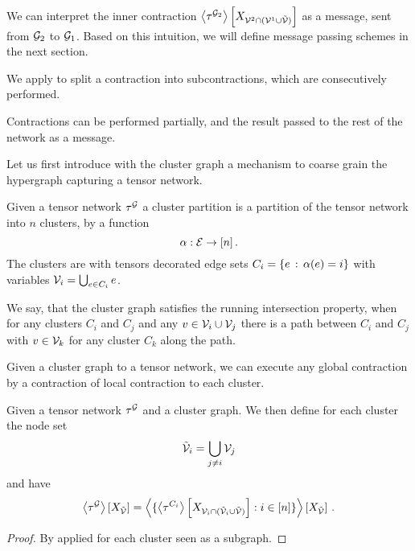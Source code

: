 We can interpret the inner contraction $\left\langle \tau^{\mathcal{G}_2}\right\rangle \left[ X_{\mathcal{V}^{2}\cap(\mathcal{V}^{1}\cup\tilde{\mathcal{V}})} \right]$ as a message, sent from $\mathcal{G}_2$ to $\mathcal{G}_1$.
Based on this intuition, we will define message passing schemes in the next section.




We apply  to split a contraction into subcontractions, which are consecutively performed.

Contractions can be performed partially, and the result passed to the rest of the network as a message.


Let us first introduce with the cluster graph a mechanism to coarse grain the hypergraph capturing a tensor network.

\begin{definition}
	Given a tensor network $\tau^{\mathcal{G}}$ a cluster partition is a partition of the tensor network into $n$ clusters, by a function
		\[ \alpha : \mathcal{E} \rightarrow [n] \, . \]
	The clusters are with tensors decorated edge sets $C_{i} = \{e \,:\, \alpha(e) = i\}$ with variables $\mathcal{V}_i = \bigcup_{e \in C_{i}} e$.

	We say, that the cluster graph satisfies the running intersection property, when for any clusters $C_i$ and $C_j$ and any $v\in\mathcal{V}_i\cup\mathcal{V}_j$ there is a path between $C_i$ and $C_j$ with $v\in\mathcal{V}_k$ for any cluster $C_k$ along the path.
\end{definition}

Given a cluster graph to a tensor network, we can execute any global contraction by a contraction of local contraction to each cluster.

\begin{theorem}\label{the:contractionClusterSplit}
	Given a tensor network $\tau^{\mathcal{G}}$ and a cluster graph.
	We then define for each cluster the node set
	\begin{align*}
		\tilde{\mathcal{V}}_i = \bigcup_{j\neq i} \mathcal{V}_j
	\end{align*}
	and have
		\[ \left\langle \tau^{\mathcal{G}}\right\rangle \left[ X_{\tilde{\mathcal{V}}} \right] = 
		\left\langle 
			\{ \left\langle \tau^{C_{i}}\right\rangle \left[ X_{\mathcal{V}_i \cap (\tilde{\mathcal{V}}_i\cup\tilde{\mathcal{V}})} \right]  : i \in [n]\}
		\right\rangle \left[ X_{\tilde{\mathcal{V}}} \right]  \, . \]
\end{theorem}
\begin{proof}
	By  applied for each cluster seen as a subgraph.
\end{proof}



